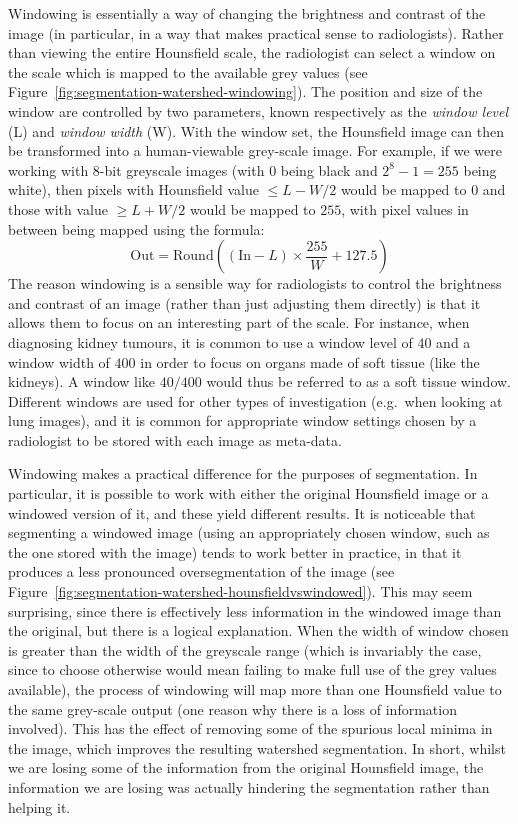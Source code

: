 Windowing is essentially a way of changing the brightness and contrast of the image (in particular, in a way that makes practical sense to radiologists). Rather than viewing the entire Hounsfield scale, the radiologist can select a window on the scale which is mapped to the available grey values (see Figure~\ref{fig:segmentation-watershed-windowing}). The position and size of the window are controlled by two parameters, known respectively as the \emph{window level} (L) and \emph{window width} (W). With the window set, the Hounsfield image can then be transformed into a human-viewable grey-scale image. For example, if we were working with 8-bit greyscale images (with $0$ being black and $2^8 - 1 = 255$ being white), then pixels with Hounsfield value $\le L - W/2$ would be mapped to $0$ and those with value $\ge L + W/2$ would be mapped to $255$, with pixel values in between being mapped using the formula:
%
\[
\mbox{Out} = \mbox{Round}\left( (\mbox{In} - L) \times \frac{255}{W} + 127.5 \right)
\]
%
The reason windowing is a sensible way for radiologists to control the brightness and contrast of an image (rather than just adjusting them directly) is that it allows them to focus on an interesting part of the scale. For instance, when diagnosing kidney tumours, it is common to use a window level of $40$ and a window width of $400$ in order to focus on organs made of soft tissue (like the kidneys). A window like $40/400$ would thus be referred to as a soft tissue window. Different windows are used for other types of investigation (e.g.~when looking at lung images), and it is common for appropriate window settings chosen by a radiologist to be stored with each image as meta-data.

Windowing makes a practical difference for the purposes of segmentation. In particular, it is possible to work with either the original Hounsfield image or a windowed version of it, and these yield different results. It is noticeable that segmenting a windowed image (using an appropriately chosen window, such as the one stored with the image) tends to work better in practice, in that it produces a less pronounced oversegmentation of the image (see Figure~\ref{fig:segmentation-watershed-hounsfieldvswindowed}). This may seem surprising, since there is effectively less information in the windowed image than the original, but there is a logical explanation. When the width of window chosen is greater than the width of the greyscale range (which is invariably the case, since to choose otherwise would mean failing to make full use of the grey values available), the process of windowing will map more than one Hounsfield value to the same grey-scale output (one reason why there is a loss of information involved). This has the effect of removing some of the spurious local minima in the image, which improves the resulting watershed segmentation. In short, whilst we are losing some of the information from the original Hounsfield image, the information we are losing was actually hindering the segmentation rather than helping it.

